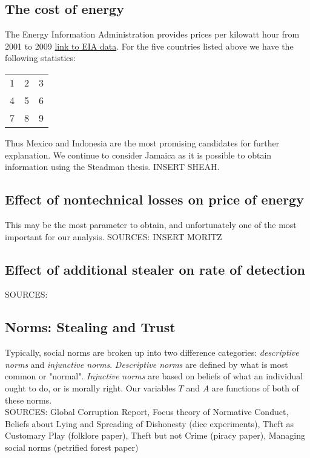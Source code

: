 \documentclass{article}
\begin{document}
\subsection{The cost of energy}
The Energy Information Administration provides prices per kilowatt hour from 2001 to 2009 \href{http://www.eia.gov/countries/prices/electricity_households.cfm}{ link to EIA data}. For the five countries listed above we have the following statistics: 

\begin{tabular}{ l c r }
  1 & 2 & 3 \\
  4 & 5 & 6 \\
  7 & 8 & 9 \\
\end{tabular}

Thus Mexico and Indonesia are the most promising candidates for further explanation. We continue to consider Jamaica as it is possible to obtain information using the Steadman thesis. INSERT SHEAH. 
 
\subsection{Effect of nontechnical losses on price of energy}
This may be the most parameter to obtain, and unfortunately one of the most important for our analysis. 
SOURCES: INSERT MORITZ
\subsection{Effect of additional stealer on rate of detection}
SOURCES: 
\subsection{Norms: Stealing and Trust}

Typically, social norms are broken up into two difference categories: 
\textit{descriptive norms} and \textit{injunctive norms}. \textit{Descriptive norms} are defined by what is most common or "normal". \textit{Injuctive norms} are based on beliefs of what an individual ought to do, or is morally right. Our variables $T$ and $A$ are functions of both of these norms.
\\

SOURCES:  Global Corruption Report, Focus theory of Normative Conduct, Beliefs about Lying and Spreading of Dishonesty (dice experiments), Theft as Customary Play (folklore paper), Theft but not Crime (piracy paper), Managing social norms (petrified forest paper)
\end{document}
